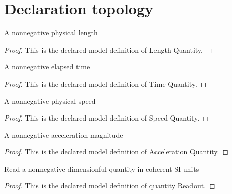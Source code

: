 \section{Declaration topology}
\begin{definition}
  \label{def:physics:phyx-mini-0744:phyxminiproblems-problemphyxmini0744-lengthquantity}
  A nonnegative physical length
\end{definition}
\begin{proof}
  This is the declared model definition of Length Quantity.
\end{proof}
\begin{definition}
  \label{def:physics:phyx-mini-0744:phyxminiproblems-problemphyxmini0744-timequantity}
  A nonnegative elapsed time
\end{definition}
\begin{proof}
  This is the declared model definition of Time Quantity.
\end{proof}
\begin{definition}
  \label{def:physics:phyx-mini-0744:phyxminiproblems-problemphyxmini0744-speedquantity}
  A nonnegative physical speed
\end{definition}
\begin{proof}
  This is the declared model definition of Speed Quantity.
\end{proof}
\begin{definition}
  \label{def:physics:phyx-mini-0744:phyxminiproblems-problemphyxmini0744-accelerationquantity}
  A nonnegative acceleration magnitude
\end{definition}
\begin{proof}
  This is the declared model definition of Acceleration Quantity.
\end{proof}
\begin{definition}
  \label{def:physics:phyx-mini-0744:phyxminiproblems-problemphyxmini0744-quantityreadout}
  Read a nonnegative dimensionful quantity in coherent SI units
\end{definition}
\begin{proof}
  This is the declared model definition of quantity Readout.
\end{proof}
